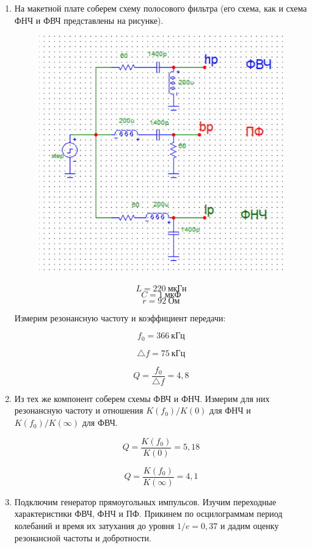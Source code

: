 \documentclass[a4paper, 12pt]{article}%
\begin{document}
\begin{enumerate}

\item На макетной плате соберем схему полосового фильтра (его схема, как и схема ФНЧ и ФВЧ представлены на рисунке).

\begin{figure}[h!]
\centering
\includegraphics[scale=0.4]{rlc2pole_img.png}
\label{fig:Image1}
\end{figure}

\[L = 220 \: \textit{мкГн}\]
\[C = 1 \: \textit{мкФ}\]
\[r = 92 \: \textit{Ом}\]

Измерим резонансную частоту и коэффициент передачи:

\[f_0 = 366 \: \textit{кГц}\]

\[\triangle f = 75 \: \textit{кГц}\]

\[Q = \frac{f_0}{\triangle f} = 4,8\]

\item Из тех же компонент соберем схемы ФВЧ и ФНЧ. Измерим для них резонансную частоту и отношения $K(f_0)/K(0)$ для ФНЧ и $K(f_0)/K(\infty)$ для ФВЧ.

\[Q = \frac{K(f_0)}{K(0)} = 5,18\]

\[Q = \frac{K(f_0)}{K(\infty)} = 4,1\]

\item Подключим генератор прямоугольных импульсов. Изучим переходные характеристики ФВЧ, ФНЧ и ПФ. Прикинем по осцилограммам период колебаний и время их затухания до уровня $1/e = 0,37$ и дадим оценку резонансной частоты и добротности.


\end{enumerate}
\end{document}
